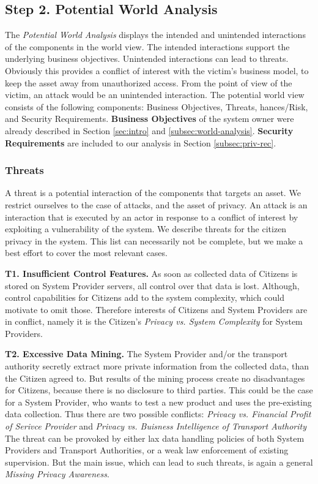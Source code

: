 \documentclass[runningheads,a4paper]{llncs}
\begin{document}
\subsection{Step 2. Potential World Analysis}
\label{subsec:pot-analysis}

The \emph{Potential World Analysis} displays the intended and unintended interactions of the components in the world view. The intended interactions support the underlying business objectives. Unintended interactions can lead to threats. Obviously this provides a conflict of interest with the victim's business model, to keep the asset away from unauthorized access. From the point of view of the victim, an attack would be an unintended interaction. The potential world view consists of the following components: Business Objectives, Threats, hances/Risk, and Security Requirements. 
\textbf{Business Objectives} of the system owner were already described in Section \ref{sec:intro} and \ref{subsec:world-analysis}. \textbf{Security Requirements} are included to our analysis in Section \ref{subsec:priv-rec}.


\subsubsection{Threats}

A threat is a potential interaction of the components that targets an asset.
We restrict ourselves to the case of attacks, and the asset of privacy.
An attack is an interaction that is executed by an actor in response to a conflict of interest by exploiting a vulnerability of the system. We describe threats for the citizen privacy in the system. This list can necessarily not be complete, but we make a best effort to cover the most relevant cases.

\textbf{T1. Insufficient Control Features.}
As soon as collected data of Citizens is stored on System Provider servers, all control over that data is lost. Although, control capabilities for Citizens add to the system complexity, which could motivate to omit those. Therefore interests of Citizens and System Providers are in conflict, namely it is the Citizen's \textit{Privacy vs. System Complexity} for System Providers.

\textbf{T2. Excessive Data Mining.}
The System Provider and/or the transport authority secretly extract more private information from the collected data, than the Citizen agreed to. But results of the mining process create no disadvantages for Citizens, because there is no disclosure to third parties. This could be the case for a System Provider, who wants to test a new product and uses the pre-existing data collection. Thus there are two possible conflicts: \textit{Privacy vs. Financial Profit of Serivce Provider} and  \textit{Privacy vs. Buisness Intelligence of Transport Authority} The threat can be provoked by either lax data handling policies of both System Providers and Transport Authorities, or a weak law enforcement of existing supervision. But the main issue, which can lead to such threats, is again a general \textit{Missing Privacy Awareness}.
\end{document}
